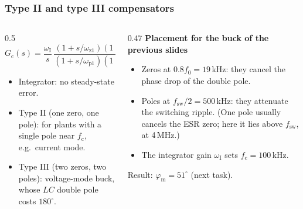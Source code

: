 \begin{frame}
	\frametitle{Type II and type III compensators}
	\begin{columns}[T]
		\begin{column}{0.5\textwidth}
			\footnotesize
			\begin{equation*}
				G_\mathrm{c}(s)=\frac{\omega_\mathrm{I}}{s}\,\frac{(1+s/\omega_{\mathrm{z}1})(1+s/\omega_{\mathrm{z}2})}{(1+s/\omega_{\mathrm{p}1})(1+s/\omega_{\mathrm{p}2})}
			\end{equation*}
			\begin{itemize}
				\item Integrator: no steady-state error.
				\item Type II (one zero, one pole): for plants with a single pole near $f_\mathrm{c}$, e.g.\ current mode.
				\item Type III (two zeros, two poles): voltage-mode buck, whose $LC$ double pole costs $180^\circ$.
			\end{itemize}
		\end{column}
		\begin{column}{0.47\textwidth}
			\footnotesize
			\textbf{Placement for the buck of the previous slides}
			\begin{itemize}
				\item Zeros at $0.8f_0=19$\,kHz: they cancel the phase drop of the double pole.
				\item Poles at $f_\mathrm{sw}/2=500$\,kHz: they attenuate the switching ripple. (One pole usually cancels the ESR zero; here it lies above $f_\mathrm{sw}$, at 4\,MHz.)
				\item The integrator gain $\omega_\mathrm{I}$ sets $f_\mathrm{c}=100$\,kHz.
			\end{itemize}
			Result: $\varphi_\mathrm{m}=51^\circ$ (next task).
		\end{column}
	\end{columns}
\end{frame}

